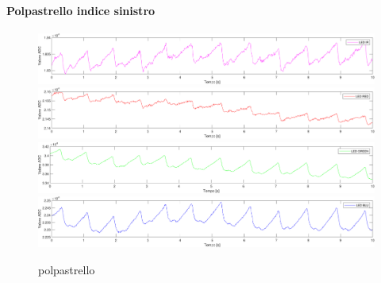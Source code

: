 \paragraph{Polpastrello indice sinistro}
\begin{figure}[h]
	\centering
	\includegraphics[width=1\linewidth]{ImageFiles/Misure Preliminari/Soggetto 1/polpastrello_ired}
	\includegraphics[width=1\linewidth]{ImageFiles/Misure Preliminari/Soggetto 1/polpastrello_red}
	\includegraphics[width=1\linewidth]{ImageFiles/Misure Preliminari/Soggetto 1/polpastrello_green}
	\includegraphics[width=1\linewidth]{ImageFiles/Misure Preliminari/Soggetto 1/polpastrello_blu}
	\caption{polpastrello}
	\label{fig:Descrizione_Segnale_PPG}
\end{figure}

